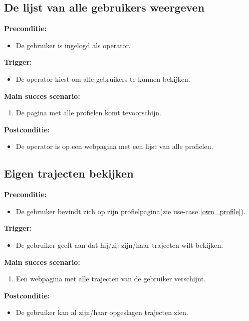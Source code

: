 \documentclass[11pt,twoside,a4paper]{article}
\newcommand{\subpunt}[1]{
	\noindent
	\textbf{\small{#1}}
}
\newenvironment{precond}{
	\subpunt{Preconditie:}
	\begin{itemize}[label={}]
}{
	\end{itemize}
}
\newenvironment{trigger}{
	\subpunt{Trigger:}
	\begin{itemize}[label={}]
}{
	\end{itemize}
}
\newenvironment{mainss}{
	\subpunt{Main succes scenario:}
	\begin{enumerate}
}{
	\end{enumerate}
}
\newenvironment{postcond}{
	\subpunt{Postconditie:}
	\begin{itemize}[label={}]
}{
	\end{itemize}
}
\begin{document}
	
	\subsection{De lijst van alle gebruikers weergeven}
	
	\begin{precond}
		\item De gebruiker is ingelogd als operator.
	\end{precond}
	
	\begin{trigger}
		\item De operator kiest om alle gebruikers te kunnen bekijken.
	\end{trigger}
	
	\begin{mainss}
		\item De pagina met alle profielen komt tevoorschijn.
	\end{mainss}
	
	\begin{postcond}
		\item De operator is op een webpagina met een lijst van alle profielen.
	\end{postcond}
	
	
	
	\subsection{Eigen trajecten bekijken}\label{own_trav}
	
	\begin{precond}
		\item De gebruiker bevindt zich op zijn profielpagina(zie use-case \ref{own_profile}).
	\end{precond}
	
	\begin{trigger}
		\item De gebruiker geeft aan dat hij/zij zijn/haar trajecten wilt bekijken.
	\end{trigger}
	
	\begin{mainss}
		\item Een webpagina met alle trajecten van de gebruiker verschijnt.
	\end{mainss}
	
	\begin{postcond}
		\item De gebruiker kan al zijn/haar opgeslagen trajecten zien.
	\end{postcond}	
	
\end{document}
